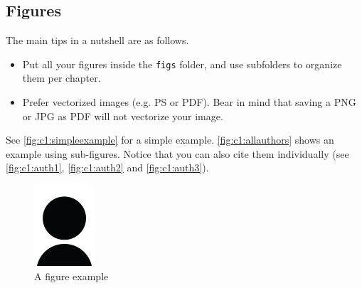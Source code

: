 \subsection{Figures}
\label{sec:c1:latex_figures}

The main tips in a nutshell are as follows.
\begin{itemize}
    \item Put all your figures inside the \texttt{figs} folder,
          and use subfolders to organize them per chapter.
    \item Prefer vectorized images (e.g. PS or PDF).
          Bear in mind that saving a PNG or JPG as PDF
          will not vectorize your image.
\end{itemize}

See \autoref{fig:c1:simpleexample} for a simple example.
\autoref{fig:c1:allauthors} shows an example using sub-figures.
Notice that you can also cite them individually
(see \autoref{fig:c1:auth1}, \autoref{fig:c1:auth2} and \autoref{fig:c1:auth3}).

\begin{figure}
    \centering
    \includegraphics[width=.2\textwidth]{figs/author}
    \caption{A figure example}
    \label{fig:c1:simpleexample}
\end{figure}

